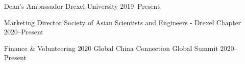 
\begin{cvhonors}

  \cvhonor
  {Dean's Ambassador} %
  {Drexel University} %
  {2019--Present} %

  \cvhonor
  {Marketing Director} %
  {Society of Asian Scientists and Engineers - Drexel Chapter} %
  {2020--Present} %

  \cvhonor
  {Finance \& Volunteering} %
  {2020 Global China Connection Global Summit} %
  {2020--Present} %

\end{cvhonors}

